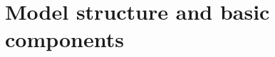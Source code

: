 \documentclass[a4paper]{llncs}
\begin{document}



\section{Model structure and basic components}
\label{sec:models}
\end{document}
